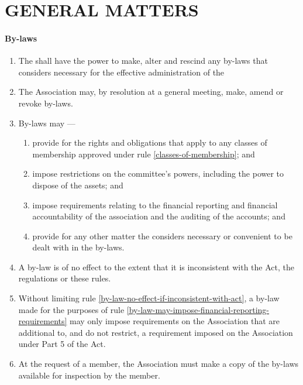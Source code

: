 \documentclass[../constitution.tex]{subfiles}
\begin{document}
\hypertarget{part-8-general-matters}{%
\part{GENERAL MATTERS}\label{part-8-general-matters}}

\hypertarget{by-laws}{%
\subsection{By-laws}\label{by-laws}}

\begin{enumerate}

\item The  shall have the power to make, alter and rescind any by-laws that 
 considers necessary for the effective administration of the  
\item The Association may, by resolution at a general meeting, make, amend or revoke by-laws.
\item By-laws may ---

  \begin{enumerate}
  
  \item provide for the rights and obligations that apply to any classes of membership approved under rule \ref{classes-of-membership}; and
  \item impose restrictions on the committee's powers, including the power to dispose of the  assets; and
  \item impose requirements relating to the financial reporting and financial accountability of the association and the auditing of the  accounts; and \label{by-law-may-impose-financial-reporting-requirements}
  \item provide for any other matter the  considers necessary or convenient to be dealt with in the by-laws.
  \end{enumerate}
\item A by-law is of no effect to the extent that it is inconsistent with the Act, the regulations or these rules. \label{by-law-no-effect-if-inconsistent-with-act}
\item Without limiting rule \ref{by-law-no-effect-if-inconsistent-with-act}, a by-law made for the purposes of rule \ref{by-law-may-impose-financial-reporting-requirements} may only impose requirements on the Association that are additional to, and do not restrict, a requirement imposed on the Association under Part 5 of the Act.
\item At the request of a member, the Association must make a copy of the by-laws available for inspection by the member.
\end{enumerate}
\end{document}
